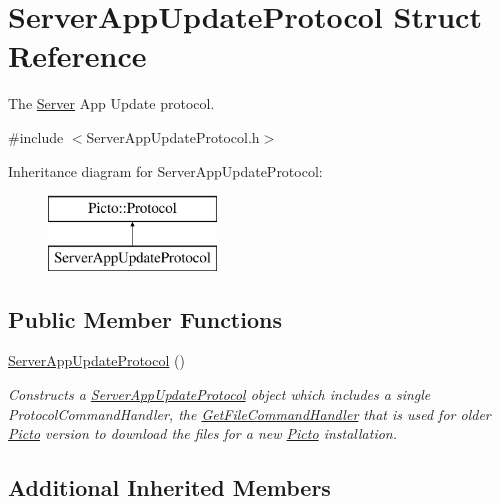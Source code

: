 \hypertarget{struct_server_app_update_protocol}{\section{Server\-App\-Update\-Protocol Struct Reference}
\label{struct_server_app_update_protocol}
}


The \hyperlink{class_server}{Server} App Update protocol.  




{\ttfamily \#include $<$Server\-App\-Update\-Protocol.\-h$>$}

Inheritance diagram for Server\-App\-Update\-Protocol\-:\begin{figure}[H]
\begin{center}
\leavevmode
\includegraphics[height=2.000000cm]{struct_server_app_update_protocol}
\end{center}
\end{figure}
\subsection*{Public Member Functions}
\begin{DoxyCompactItemize}
\item 
\hypertarget{struct_server_app_update_protocol_a80586fdbce2d5a37bbcba3bff29dc6a5}{\hyperlink{struct_server_app_update_protocol_a80586fdbce2d5a37bbcba3bff29dc6a5}{Server\-App\-Update\-Protocol} ()}\label{struct_server_app_update_protocol_a80586fdbce2d5a37bbcba3bff29dc6a5}

\begin{DoxyCompactList}\small\item\em Constructs a \hyperlink{struct_server_app_update_protocol}{Server\-App\-Update\-Protocol} object which includes a single Protocol\-Command\-Handler, the \hyperlink{struct_get_file_command_handler}{Get\-File\-Command\-Handler} that is used for older \hyperlink{namespace_picto}{Picto} version to download the files for a new \hyperlink{namespace_picto}{Picto} installation. \end{DoxyCompactList}\end{DoxyCompactItemize}
\subsection*{Additional Inherited Members}



